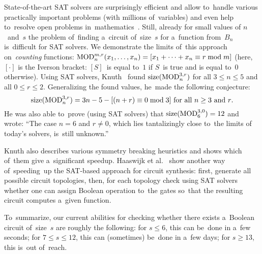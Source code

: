 State-of-the-art SAT solvers are surprisingly efficient and allow to~handle
various practically important problems (with millions
of~variables) and even help to~resolve open
problems in~mathematics~\cite{DBLP:conf/cade/BrakensiekHMN20}.
Still, already for small values of $n$~and~$s$ the problem
of~finding a~circuit of~size~$s$ for a~function from~$B_n$
is~difficult for SAT solvers.
We demonstrate the limits
of~this approach on~\emph{counting} functions:
    $\operatorname{MOD}_n^{m,r}(x_1, \dotsc, x_n)=[x_1+\dotsb+x_n \equiv r \bmod m]$
(here, $[\cdot]$ is the Iverson bracket: $[S]$~is equal to~$1$ if $S$~is true and is equal to~$0$ otherwise).
Using SAT solvers, Knuth~\cite[solution to exercise~$480$]{Knuth:2015:ACP:2898950}
found $\operatorname{size}(\operatorname{MOD}_n^{3,r})$ for all $3 \le n \le 5$ and all $0 \le r \le 2$.
%
Generalizing the found values, he~made the following conjecture:
\begin{equation}\label{conjecture}
\operatorname{size}(\operatorname{MOD}_n^{3,r})=3n-5-[(n+r) \equiv 0\bmod 3] \text{ for all $n \ge 3$ and $r$.}
\end{equation}
He was also able to~prove (using SAT solvers)
that $\operatorname{size}(\operatorname{MOD}_6^{3,0})=12$
and wrote:
``The case $n=6$ and $r \neq 0$, which lies tantalizingly close to~the limits of
today's solvers, is~still unknown.'' 

Knuth also describes various symmetry breaking heuristics and shows which of~them give a~significant speedup. 
Haaswijk et al.~\cite{DBLP:conf/dac/HaaswijkMSM18}
show another way of~speeding~up the SAT-based approach for circuit synthesis:
first, generate all possible circuit topologies, then, for each topology check using SAT solvers whether one can assign Boolean operation to~the gates so~that the resulting circuit computes a~given function.

To~summarize, our current abilities for checking whether there exists a~Boolean circuit of~size~$s$ are roughly the following:
for $s \le 6$, this can be~done in a~few seconds;
for $7 \le s \le 12$, this can (sometimes)
be~done in a~few days;
for $s \ge 13$, this is~out of~reach.

